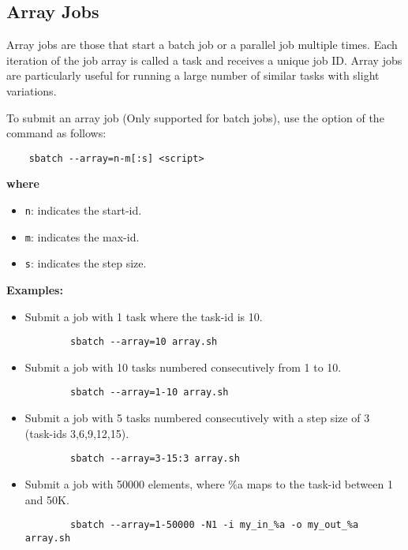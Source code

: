 \subsection{Array Jobs}
\label{sect:array-jobs}

Array jobs are those that start a batch job or a parallel job multiple times.
Each iteration of the job array is called a task and receives a unique job ID.
Array jobs are particularly useful for running a large number of similar tasks with slight variations.

To submit an array job (Only supported for batch jobs),
use the  option of the  command as follows:

\begin{verbatim}
	sbatch --array=n-m[:s] <script>
\end{verbatim}

\textbf{where}
\begin{itemize}
	\item \texttt{n}: indicates the start-id.
	\item \texttt{m}: indicates the max-id.
	\item \texttt{s}: indicates the step size.
\end{itemize}

\textbf{Examples:}
\begin{itemize}
	\item Submit a job with 1 task where the task-id is 10.
	\begin{verbatim}
		sbatch --array=10 array.sh
	\end{verbatim}

	\item Submit a job with 10 tasks numbered consecutively from 1 to 10.
	\begin{verbatim}
		sbatch --array=1-10 array.sh
	\end{verbatim}

	\item Submit a job with 5 tasks numbered consecutively with a step size of 3\\
	(task-ids 3,6,9,12,15).
	\begin{verbatim}
		sbatch --array=3-15:3 array.sh
	\end{verbatim}

	\item Submit a job with 50000 elements, where \%a maps to the task-id between 1 and 50K.
	\begin{verbatim}
		sbatch --array=1-50000 -N1 -i my_in_%a -o my_out_%a array.sh
	\end{verbatim}
\end{itemize}

